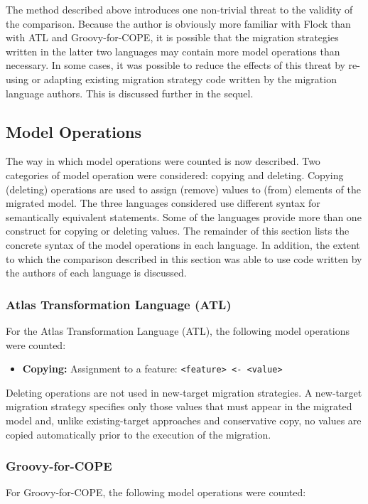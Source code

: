 The method described above introduces one non-trivial threat to the validity of the comparison. Because the author is obviously more familiar with Flock than with ATL and Groovy-for-COPE, it is possible that the migration strategies written in the latter two languages may contain more model operations than necessary. In some cases, it was possible to reduce the effects of this threat by re-using or adapting existing migration strategy code written by the migration language authors. This is discussed further in the sequel.

\subsection{Model Operations}
\label{subsubsec:quantitive_model_operations}
The way in which model operations were counted is now described. Two categories of model operation were considered: copying and deleting. Copying (deleting) operations are used to assign (remove) values to (from) elements of the migrated model. The three languages considered use different syntax for semantically equivalent statements. Some of the languages provide more than one construct for copying or deleting values. The remainder of this section lists the concrete syntax of the model operations in each language. In addition, the extent to which the comparison described in this section was able to use code written by the authors of each language is discussed.

\subsubsection{Atlas Transformation Language (ATL)}
For the Atlas Transformation Language (ATL), the following model operations were counted:
	
\begin{itemize}
	\item \textbf{Copying:} Assignment to a feature:
	\subitem \texttt{<feature> <- <value>} 
\end{itemize}

Deleting operations are not used in new-target migration strategies. A new-target migration strategy specifies only those values that must appear in the migrated model and, unlike existing-target approaches and conservative copy, no values are copied automatically prior to the execution of the migration.


\subsubsection{Groovy-for-COPE}
For Groovy-for-COPE, the following model operations were counted:

